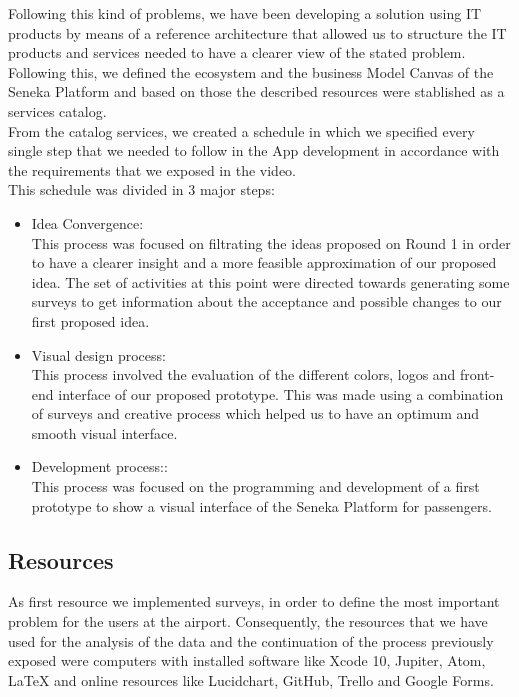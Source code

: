 \documentclass[12pt]{article}
\begin{document}
Following this kind of problems, we have been developing a solution using IT products by means of a reference architecture that allowed us to structure the IT products and services needed to have a clearer view of the stated problem.\\

Following this, we defined the ecosystem and the business Model Canvas of the Seneka Platform and based on those the described resources were stablished as a services catalog.\\

From the catalog services, we created a schedule in which we specified every single step that we needed to follow in the App development in accordance with the requirements that we exposed in the video.\\

This schedule was divided in 3 major steps:

\begin{itemize}
	\item Idea Convergence:\\
	This process was focused on filtrating the ideas proposed on Round 1 in order to have a clearer insight and a more feasible approximation of our proposed idea. The 	set of activities at this point were directed towards generating some surveys to get information about the acceptance and possible changes to our first proposed idea.
	\item Visual design process:\\
	This process involved the evaluation of the different colors, logos and front-end interface of our proposed prototype. This was made using a combination of surveys 		and creative process which helped us to have an optimum and smooth visual interface.
	\item Development process::\\
	This process was focused on the programming and development of a first prototype to show a visual interface of the Seneka Platform for passengers.
\end{itemize}


\subsection{Resources}

As first resource we implemented surveys, in order to define the most important problem for the users at the airport. Consequently,  the resources that we have used for the analysis of the data and the continuation of the process previously exposed were computers with installed software like Xcode 10, Jupiter, Atom, LaTeX and online resources like Lucidchart, GitHub, Trello and Google Forms.\\  
\end{document}
